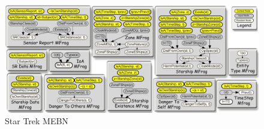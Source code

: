 \begin{frame}
	\begin{figure}
		\centering
		\includegraphics[width=\textwidth]{images/startrekontology}
		\caption{Star Trek MEBN}
	\end{figure}
\end{frame}